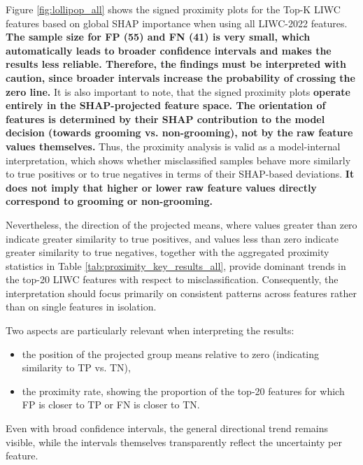 Figure \ref{fig:lollipop_all} shows the signed proximity plots for the Top-K LIWC features based on global SHAP importance when using all LIWC-2022 features. \textbf{The sample size for FP (55) and FN (41) is very small, which automatically leads to broader confidence intervals and makes the results less reliable. Therefore, the findings must be interpreted with caution, since broader intervals increase the probability of crossing the zero line.} It is also important to note, that the signed proximity plots \textbf{operate entirely in the SHAP-projected feature space. The orientation of features is determined by their SHAP contribution to the model decision (towards grooming vs. non-grooming), not by the raw feature values themselves.} Thus, the proximity analysis is valid as a model-internal interpretation, which shows whether misclassified samples behave more similarly to true positives or to true negatives in terms of their SHAP-based deviations. \textbf{It does not imply that higher or lower raw feature values directly correspond to grooming or non-grooming.}

Nevertheless, the direction of the projected means, where values greater than zero indicate greater similarity to true positives, and values less than zero indicate greater similarity to true negatives, together with the aggregated proximity statistics in Table \ref{tab:proximity_key_results_all}, provide dominant trends in the top-20 LIWC features with respect to misclassification. Consequently, the interpretation should focus primarily on consistent patterns across features rather than on single features in isolation.

Two aspects are particularly relevant when interpreting the results:
\begin{itemize}
\item the position of the projected group means relative to zero (indicating similarity to TP vs. TN),
\item the proximity rate, showing the proportion of the top-20 features for which FP is closer to TP or FN is closer to TN.
\end{itemize}

Even with broad confidence intervals, the general directional trend remains visible, while the intervals themselves transparently reflect the uncertainty per feature.

